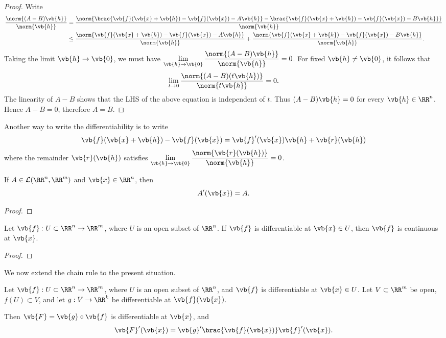 \begin{proof}
Write
\begin{align*}
\frac{\norm{(A-B)\vb{h}}}{\norm{\vb{h}}}
&=\frac{\norm{\brac{\vb{f}(\vb{x}+\vb{h})-\vb{f}(\vb{x})-A\vb{h}}-\brac{\vb{f}(\vb{x}+\vb{h})-\vb{f}(\vb{x})-B\vb{h}}}}{\norm{\vb{h}}}\\
&\le\frac{\norm{\vb{f}(\vb{x}+\vb{h})-\vb{f}(\vb{x})-A\vb{h}}}{\norm{\vb{h}}}+\frac{\norm{\vb{f}(\vb{x}+\vb{h})-\vb{f}(\vb{x})-B\vb{h}}}{\norm{\vb{h}}}.
\end{align*}
Taking the limit $\vb{h}\to\vb{0}$, we must have $\displaystyle\lim_{\vb{h}\to\vb{0}}\frac{\norm{(A-B)\vb{h}}}{\norm{\vb{h}}}=0$. For fixed $\vb{h}\neq\vb{0}$, it follows that
\[\lim_{t\to0}\frac{\norm{(A-B)(t\vb{h})}}{\norm{t\vb{h}}}=0.\]
The linearity of $A-B$ shows that the LHS of the above equation is independent of $t$. Thus $(A-B)\vb{h}=0$ for every $\vb{h}\in\RR^n$. Hence $A-B=0$, therefore $A=B$. 
\end{proof}

Another way to write the differentiability is to write
\[\vb{f}(\vb{x}+\vb{h})-\vb{f}(\vb{x})=\vb{f}^\prime(\vb{x})\vb{h}+\vb{r}(\vb{h})\]
where the remainder $\vb{r}(\vb{h})$ satisfies $\displaystyle\lim_{\vb{h}\to\vb{0}}\frac{\norm{\vb{r}(\vb{h})}}{\norm{\vb{h}}}=0$.

\begin{example}
If $A\in\mathcal{L}(\RR^n,\RR^m)$ and $\vb{x}\in\RR^n$, then
\[A^\prime(\vb{x})=A.\]
\begin{proof}

\end{proof}
\end{example}

\begin{lemma}
Let $\vb{f}:U\subset\RR^n\to\RR^m$, where $U$ is an open subset of $\RR^n$. If $\vb{f}$ is differentiable at $\vb{x}\in U$, then $\vb{f}$ is continuous at $\vb{x}$.
\end{lemma}

\begin{proof}

\end{proof}

We now extend the chain rule to the present situation. 

\begin{lemma}
Let $\vb{f}:U\subset\RR^n\to\RR^m$, where $U$ is an open subset of $\RR^n$, and $\vb{f}$ is differentiable at $\vb{x}\in U$. Let $V\subset\RR^m$ be open, $f(U)\subset V$, and let $g:V\to\RR^k$ be differentiable at $\vb{f}(\vb{x})$.

Then $\vb{F}=\vb{g}\circ\vb{f}$ is differentiable at $\vb{x}$, and
\[\vb{F}^\prime(\vb{x})=\vb{g}^\prime\brac{\vb{f}(\vb{x})}\vb{f}^\prime(\vb{x}).\]
\end{lemma}

